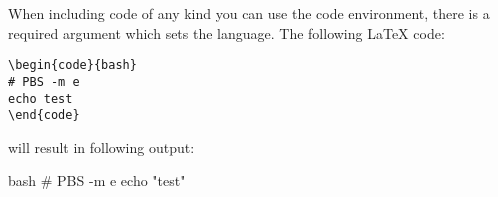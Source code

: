 \documentclass[11pt,a4paper]{article}
\begin{document}
When including code of any kind you can use the code environment, there is a
required argument which sets the language. The following LaTeX code:

\begin{verbatim}
\begin{code}{bash}
# PBS -m e
echo test
\end{code}
\end{verbatim}

will result in following output:

\begin{code}{bash}
# PBS -m e
echo "test"
\end{code}
\end{document}
